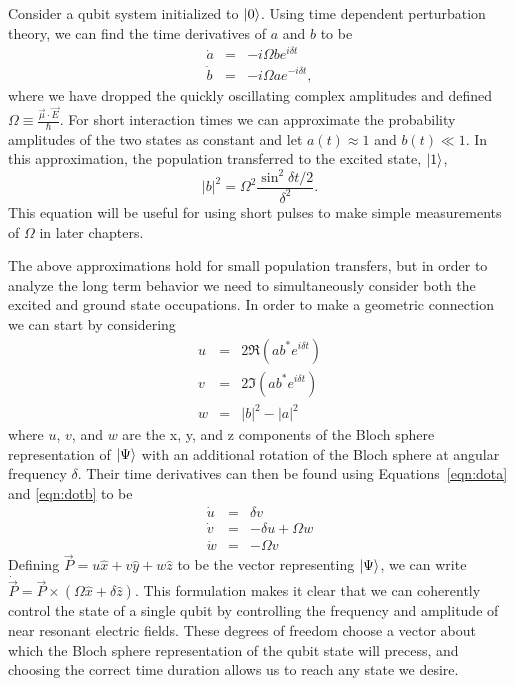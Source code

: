 Consider a qubit system initialized to $\left| 0 \right>$.  Using time dependent perturbation theory, we can find the time derivatives of $a$ and $b$ to be 
\begin{eqnarray}
	\label{eqn:dota}
	\dot{a} &=& -i \Omega b e^{i \delta t} \\
	\label{eqn:dotb}
	\dot{b} &=& -i \Omega a e^{-i \delta t} \mathrm{,}
\end{eqnarray}
where we have dropped the quickly oscillating complex amplitudes and defined $\Omega \equiv \frac{ \vec{\mu} \cdot \vec{E} }{\hbar}$.  For short interaction times we can approximate the probability amplitudes of the two states as constant and let $a(t) \approx 1$ and $b(t) \ll 1$.  In this approximation, the population transferred to the excited state, $\left| 1 \right>$, 
\begin{equation}
	\left| b \right| ^2 = \Omega^2 \frac{\sin^2{ \delta t / 2 }}{\delta^2} \mathrm{.}
	\label{eqn:shortpulses}
\end{equation}
This equation will be useful for using short pulses to make simple measurements of $\Omega$ in later chapters.

The above approximations hold for small population transfers, but in order to analyze the long term behavior we need to simultaneously consider both the excited and ground state occupations.  In order to make a geometric connection we can start by considering
\begin{eqnarray}
	u &=& 2\Re(a b^* e^{i \delta t}) \\
	v &=& 2\Im(a b^* e^{i \delta t}) \\
	w &=& \left| b \right|^2 - \left| a \right|^2
\end{eqnarray}
where $u$, $v$, and $w$ are the x, y, and z components of the Bloch sphere representation of $\left| \Psi \right>$ with an additional rotation of the Bloch sphere at angular frequency $\delta$.  Their time derivatives can then be found using Equations~\ref{eqn:dota} and \ref{eqn:dotb} to be
\begin{eqnarray}
	\dot{u} &=& \delta v \\
	\dot{v} &=& -\delta u + \Omega w \\
	\dot{w} &=& -\Omega v
	\label{eqn:wdot}
\end{eqnarray}
Defining $\vec{P} = u \hat{x} + v \hat{y} + w \hat{z}$ to be the vector representing $\left| \Psi \right>$, we can write $\dot{\vec{P}} = \vec{P} \times ( \Omega \hat{x} + \delta \hat{z} )$.  This formulation makes it clear that we can coherently control the state of a single qubit by controlling the frequency and amplitude of near resonant electric fields.  These degrees of freedom choose a vector about which the Bloch sphere representation of the qubit state will precess, and choosing the correct time duration allows us to reach any state we desire. 

